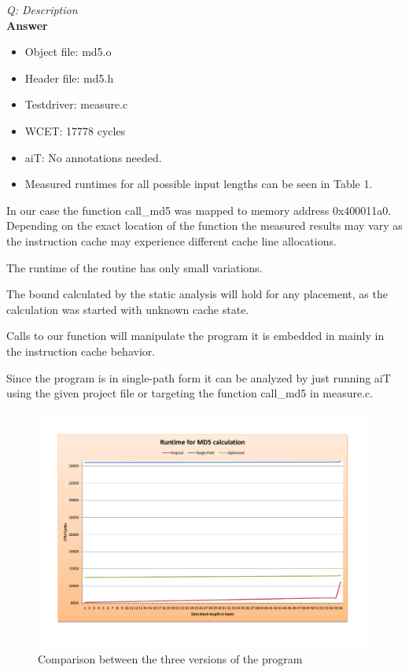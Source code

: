 \documentclass[a4paper,english,12pt,oneside]{article}
\newcommand{\Quest}[2]{
\noindent\emph{Q: #1}\\[0.5cm]
\noindent\textbf{Answer}\\
\noindent #2
\vspace{0.7cm}
}
\begin{document}
\Quest{Description}
{
\begin{itemize}
\item[ ] Object file: md5.o
\item[ ] Header file: md5.h
\item[ ] Testdriver: measure.c
\item[ ] WCET: 17778 cycles
\item[ ] aiT: No annotations needed.
\item[ ] Measured runtimes for all possible input lengths can be seen in Table 1.
\end{itemize}

In our case the function call\_md5 was mapped to memory address 0x400011a0.
Depending on the exact location of the function the measured results may vary as the instruction cache may experience different cache line allocations.

The runtime of the routine has only small variations.

The bound calculated by the static analysis will hold for any placement, as the calculation was started with unknown cache state.

Calls to our function will manipulate the program it is embedded in mainly in the instruction cache behavior.

Since the program is in single-path form it can be analyzed by just running aiT using the given project file or targeting the function call\_md5 in measure.c.
}

\begin{landscape}
\begin{figure}
\includegraphics[height=\textwidth]{comparison.pdf}
\caption{Comparison between the three versions of the program}
\label{fig:comp}
\end{figure}
\end{landscape}
\end{document}
